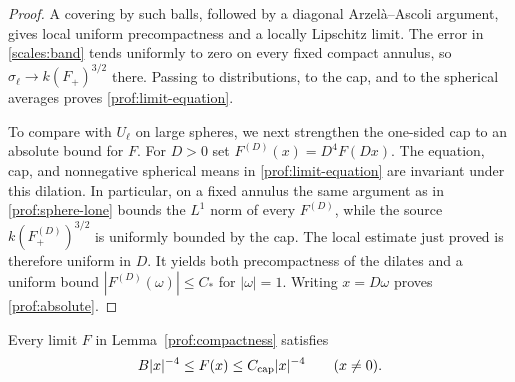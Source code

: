 \begin{proof}
A covering by such balls, followed by a diagonal
Arzel\`a--Ascoli argument, gives local uniform precompactness and a
locally Lipschitz limit.  The error in \eqref{scales:band} tends
uniformly to zero on every fixed compact annulus, so
$\sigma_\ell\to k(F_+)^{3/2}$ there.  Passing to distributions, to the
cap, and to the spherical averages proves
\eqref{prof:limit-equation}.

To compare with $U_\ell$ on large spheres, we next strengthen the
one-sided cap to an absolute bound for $F$.
For $D>0$ set $F^{(D)}(x)=D^4F(Dx)$.  The equation, cap, and
nonnegative spherical means in \eqref{prof:limit-equation} are
invariant under this dilation.  In particular, on a fixed annulus
the same argument as in \eqref{prof:sphere-lone} bounds the $L^1$
norm of every $F^{(D)}$, while the source
$k(F^{(D)}_+)^{3/2}$ is uniformly bounded by the cap.  The local
estimate just proved is therefore uniform in $D$.  It yields both
precompactness of the dilates and a uniform bound
$|F^{(D)}(\omega)|\le C_*$ for $|\omega|=1$.  Writing $x=D\omega$
proves \eqref{prof:absolute}.
\end{proof}

\begin{lemma}
\label{prof:lower}
Every limit $F$ in Lemma~\ref{prof:compactness} satisfies
\begin{equation}
\label{prof:positive}
 B|x|^{-4}\le F(x)\le C_{\rm cap}|x|^{-4}\qquad(x\ne0).
\end{equation}
\end{lemma}

